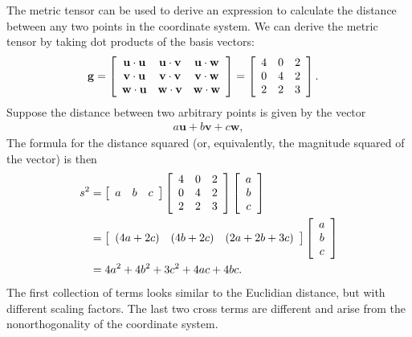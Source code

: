 The metric tensor can be used to derive an expression to calculate the distance between any two points in the coordinate system. We can derive the metric tensor by taking dot products of the basis vectors:
\begin{align}
  \mathbf{g} &= \left[ \begin{array}{c c c} \mathbf{u} \cdot \mathbf{u} & \mathbf{u} \cdot \mathbf{v} & \mathbf{u} \cdot \mathbf{w} \\
      							      		\mathbf{v} \cdot \mathbf{u} & \mathbf{v} \cdot \mathbf{v} & \mathbf{v} \cdot \mathbf{w} \\ 
								      		\mathbf{w} \cdot \mathbf{u} & \mathbf{w} \cdot \mathbf{v} & \mathbf{w} \cdot \mathbf{w} \end{array} \right] 
			  = \left[ \begin{array}{c c c} 4 & 0 & 2 \\
      							      		0 & 4 & 2 \\ 
								      		2 & 2 & 3 \end{array} \right] .
\end{align}
Suppose the distance between two arbitrary points is given by the vector
\begin{align}
  a \mathbf{u} + b \mathbf{v} + c \mathbf{w} , \nonumber
\end{align}
The formula for the distance squared (or, equivalently, the magnitude squared of the vector) is then
\begin{align}
  s^2 	&= \left[ \begin{array}{c c c} a & b & c \\ \end{array} \right]
           \left[ \begin{array}{c c c} 4 & 0 & 2 \\
      							      		0 & 4 & 2 \\ 
								      		2 & 2 & 3 \end{array} \right]
		   \left[ \begin{array}{c} a \\ b \\ c \\ \end{array} \right] \nonumber \\
		&= \left[ \begin{array}{c c c} ( 4a + 2c ) & ( 4b + 2c ) & ( 2a + 2b + 3c ) \\ \end{array} \right]
		   \left[ \begin{array}{c} a \\ b \\ c \\ \end{array} \right] \nonumber \\
		&= 4a^2 + 4b^2 + 3c^2 + 4ac + 4bc .
\end{align}
The first collection of terms looks similar to the Euclidian distance, but with different scaling factors. The last two cross terms are different and arise from the nonorthogonality of the coordinate system.

